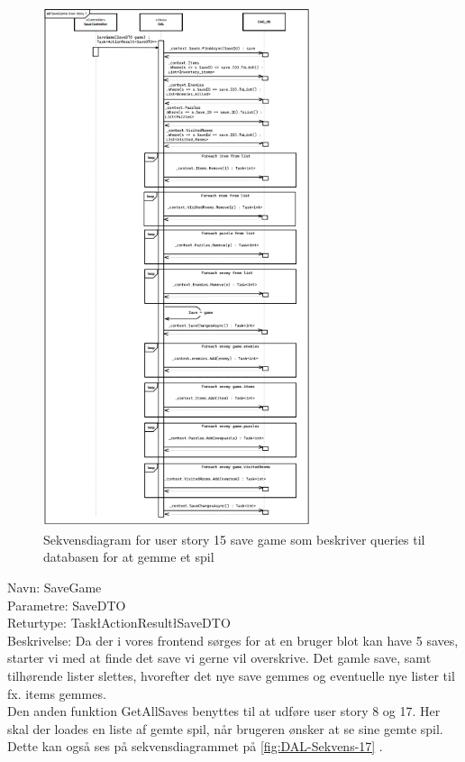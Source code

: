 \begin{figure}[H]
\centering
\includegraphics[width = 0.7\textwidth]{02-Body/Images/DAL-Database/SaveSd.PNG}
\caption{Sekvensdiagram for user story 15 save game som beskriver queries til databasen for at gemme et spil}
\label{fig:DAL-Sekvens-7}
\end{figure}


Navn: SaveGame\\
Parametre: SaveDTO\\
Returtype: Task\l ActionResult\l SaveDTO\g\g \\
Beskrivelse: Da der i vores frontend sørges for at en bruger blot kan have 5 saves, starter vi med at finde det save vi gerne vil overskrive. Det gamle save, samt tilhørende lister slettes, hvorefter det nye save gemmes og eventuelle nye lister til fx. items gemmes.\\

Den anden funktion GetAllSaves benyttes til at udføre user story 8 og 17.
Her skal der loades en liste af gemte spil, når brugeren ønsker at se sine gemte spil. Dette kan også ses på sekvensdiagrammet på \autoref{fig:DAL-Sekvens-17} .

